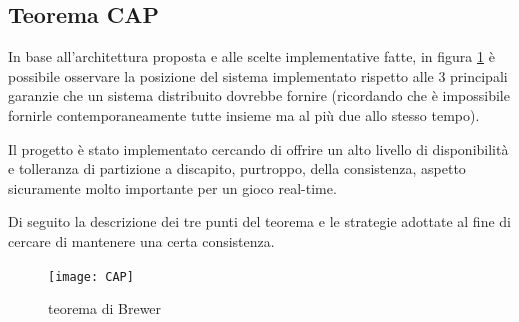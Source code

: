 \documentclass[paper=a4, fontsize=11pt]{scrartcl} %
\numberwithin{equation}{section} %
\numberwithin{figure}{section} %
\numberwithin{table}{section} %
\begin{document}
\subsection{Teorema CAP}
In base all'architettura proposta e alle scelte implementative fatte, in figura \ref{CAP} è possibile osservare la posizione del sistema implementato rispetto alle 3 principali garanzie che un sistema distribuito dovrebbe fornire (ricordando che è impossibile fornirle contemporaneamente tutte insieme ma al più due allo stesso tempo).

Il progetto è stato implementato cercando di offrire un alto livello di disponibilità e tolleranza di partizione a discapito, purtroppo, della consistenza, aspetto sicuramente molto importante per un gioco real-time.

Di seguito la descrizione dei tre punti del teorema e le strategie adottate al fine di cercare di mantenere una certa consistenza.
\begin{figure}
\centering
\texttt{[image: CAP]}
\caption{teorema di Brewer}
\label{CAP}
\end{figure}
\end{document}
